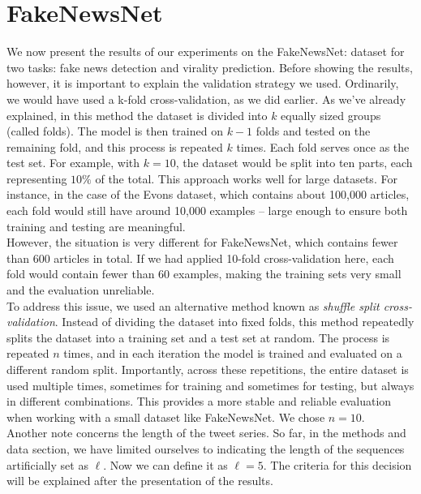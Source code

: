 \documentclass[a4paper,twoside,12pt]{book}
\begin{document}
\section{FakeNewsNet}

We now present the results of our experiments on the FakeNewsNet: dataset for two tasks: fake news detection and virality prediction. Before showing the results, however, it is important to explain the validation strategy we used. Ordinarily, we would have used a k-fold cross-validation, as we did earlier. As we've already explained, in this method the dataset is divided into $k$ equally sized groups (called folds). The model is then trained on $k - 1$ folds and tested on the remaining fold, and this process is repeated $k$ times. Each fold serves once as the test set. For example, with $k = 10$, the dataset would be split into ten parts, each representing $10\%$ of the total. This approach works well for large datasets. For instance, in the case of the Evons dataset, which contains about 100,000 articles, each fold would still have around 10,000 examples -- large enough to ensure both training and testing are meaningful.  \\

However, the situation is very different for FakeNewsNet, which contains fewer than 600 articles in total. If we had applied 10-fold cross-validation here, each fold would contain fewer than 60 examples, making the training sets very small and the evaluation unreliable.  \\
To address this issue, we used an alternative method known as \emph{shuffle split cross-validation}. Instead of dividing the dataset into fixed folds, this method repeatedly splits the dataset into a training set and a test set at random. The process is repeated $n$ times, and in each iteration the model is trained and evaluated on a different random split. Importantly, across these repetitions, the entire dataset is used multiple times, sometimes for training and sometimes for testing, but always in different combinations. This provides a more stable and reliable evaluation when working with a small dataset like FakeNewsNet. We chose $ n=10$. \\

Another note concerns the length of the tweet series. So far, in the methods and data section, we have limited ourselves to indicating the length of the sequences artificially set as $\ell$. Now we can define it as $\ell=5$. The criteria for this decision will be explained after the presentation of the results.
\end{document}
